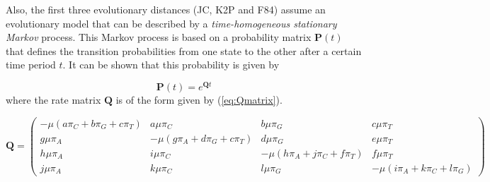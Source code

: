 Also, the first three evolutionary distances (JC, K2P and F84) assume an evolutionary model that can be described by a \textit{time-homogeneous stationary Markov} process. %
This Markov process is based on a probability matrix $\mathbf{P}(t)$ that defines the transition probabilities from one state to the other after a certain time period $t$. It can be shown \cite{PM09} %
that this probability is given by 

\begin{equation}
\mathbf{P}(t) = e^{\mathbf{Q}t}
\label{eq:probability}
\end{equation}
where the rate matrix $\mathbf{Q}$ is of the form given by (\ref{eq:Qmatrix}).


\begin{footnotesize}
\begin{equation}
\mathbf{Q} = \begin{pmatrix}
-\mu(a\pi_C+b\pi_G + c\pi_T) & a\mu\pi_C & b\mu\pi_G & c\mu\pi_T\\
g\mu\pi_A&-\mu(g\pi_A+d\pi_G + c\pi_T) & d\mu\pi_G & e\mu\pi_T\\
h\mu\pi_A & i\mu\pi_C & -\mu(h\pi_A+j\pi_C + f\pi_T) & f\mu\pi_T\\
j\mu\pi_A & k\mu\pi_C & l\mu\pi_G & -\mu(i\pi_A+k\pi_C + l\pi_G)
\end{pmatrix}
\label{eq:Qmatrix}
\end{equation}
\end{footnotesize}



